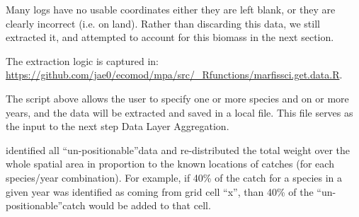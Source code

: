 \documentclass[letterpaper,portrait,11pt]{scrartcl}
\numberwithin{equation}{section}		%
\numberwithin{figure}{section}		%
\numberwithin{table}{section}				%
\begin{document}
Many logs have no usable coordinates \textendash  either they are left blank, or they are clearly incorrect (i.e. on land).  Rather than discarding this data, we still extracted it, and attempted to account for this biomass in the next section.

The extraction logic is captured in: \\
\url{https://github.com/jae0/ecomod/mpa/src/\_Rfunctions/marfissci.get.data.R}.

The script above allows the user to specify one or more species and on or more years, and the data will be extracted and saved in a local file.  This file serves as the input to the next step \textendash Data Layer Aggregation.

identified all \textquotedblleft un-positionable\textquotedblright  data and re-distributed the total weight over the whole spatial area in proportion to the known locations of catches (for each species/year combination).  For example, if 40\% of the catch for a species in a given year was identified as coming from grid cell \textquotedblleft x\textquotedblright, than 40\% of the \textquotedblleft un-positionable\textquotedblright catch would be added to that cell. 





\end{document}
